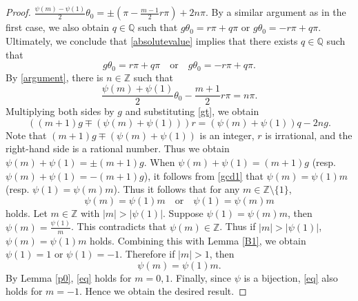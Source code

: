 \documentclass[10pt]{amsart}
\begin{document}
\begin{proof}
$\frac{\psi(m)-\psi(1)}{2} \theta_0=\pm (\pi - \frac{m-1}{2} r\pi)+2n \pi$.
By a similar argument as in the first case, we also obtain $q \in \mathbb{Q}$ such that 
$g \theta_0=r\pi + q\pi$ or $g \theta_0=-r\pi + q\pi$. \\ 
Ultimately, we conclude that \eqref{absolutevalue} implies that there exists $q \in \mathbb{Q}$ such that 
\begin{equation}\label{gt}
g \theta_0=r\pi + q\pi \quad \text{or}  \quad g \theta_0=-r\pi + q\pi.
\end{equation}
 By \eqref{argument}, there is $n \in \mathbb{Z}$ such that 
\[
\frac{\psi(m)+\psi(1)}{2}\theta_0-\frac{m+1}{2}r \pi=n \pi.
\]
Multiplying both sides by $g$ and substituting \eqref{gt}, we obtain 
\[
((m+1)g \mp (\psi(m)+\psi(1)))r =(\psi(m)+\psi(1))q -2ng.
\]
Note that $(m+1)g \mp (\psi(m)+\psi(1))$ is an integer, $r$ is irrational, and the right-hand side is a rational number. Thus we obtain $\psi(m)+\psi(1)=\pm (m+1)g$. When $\psi(m)+\psi(1)=(m+1)g$ (resp.  $\psi(m)+\psi(1)=-(m+1)g$), it follows from \eqref{gcd1} that
$\psi(m)=\psi(1)m$ (resp. $\psi(1)=\psi(m)m$).  Thus it follows that for any $m \in \mathbb{Z} \setminus \{1\} $, 
\[
\psi(m)=\psi(1)m  \quad \text{or} \quad \psi(1)=\psi(m)m
\]
holds. Let $m \in \mathbb{Z}$ with $|m|>|\psi(1)|$. Suppose $\psi(1)=\psi(m)m$, then $\psi(m)=\frac{\psi(1)}{m}$. This contradicts that  $\psi(m) \in \mathbb{Z}$. Thus if  $|m|>|\psi(1)|$, $\psi(m)=\psi(1)m$ holds.  Combining this with Lemma \ref{B1},  we obtain $\psi(1)=1$ or $\psi(1)=-1$. 
Therefore if  $|m|>1$, then 
\begin{equation}\label{eq}
\psi(m)=\psi(1)m.
\end{equation}
By Lemma \ref{p0}, \eqref{eq} holds for $m=0,1$.  Finally, since $\psi$ is a bijection, \eqref{eq}  also holds for $m=-1$. Hence we obtain the desired result.
\end{proof}
\end{document}
